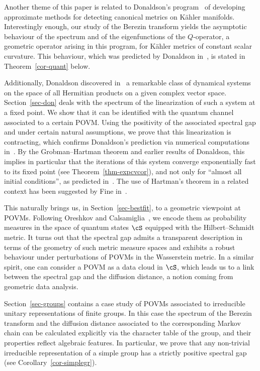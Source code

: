 
Another theme of this paper is related to Donaldson's program~\cite{D} of developing approximate methods for detecting canonical metrics on K\"ahler manifolds. Interestingly enough, our study of the Berezin transform yields the asymptotic behaviour of the spectrum and of the eigenfunctions of the $Q$-operator, a geometric operator arising in this program, for K\"ahler metrics of constant scalar curvature. This behaviour, which was predicted by Donaldson in~\cite{D}, is stated in Theorem~\ref{cor-quant} below.

Additionally, Donaldson discovered in~\cite{D} a remarkable class of dynamical systems on the space of all Hermitian products on a given complex vector space. Section~\ref{sec-don} deals with the spectrum of the linearization of such a system at a fixed point. We show that it can be identified with the quantum channel associated to a certain POVM. Using the positivity of the associated spectral gap and under certain natural assumptions, we prove that this linearization is contracting, which confirms Donaldson's prediction via numerical computations in~\cite[Section~3]{D}. By the Grobman--Hartman theorem and earlier results of Donaldson, this implies in particular that the iterations of this system converge exponentially fast to its fixed point (see Theorem~\ref{thm-expcvcor}), and not only for ``almost all initial conditions'', as predicted in~\cite[Section~4.1]{D}. The use of Hartman's theorem in a related context has been suggested by Fine in~\cite{Fin12}.


This naturally brings us, in Section~\ref{sec-bestfit}, to a geometric viewpoint at POVMs. Following Oreshkov and Calsamiglia~\cite[VII.C]{OC}, we encode them as probability measures in the space of quantum states $\cS$ equipped with the Hilbert--Schmidt metric. It turns out that the spectral gap admits a transparent description in terms of the geometry of such metric measure spaces and exhibits a robust behaviour under perturbations of POVMs in the Wasserstein metric. In a similar spirit, one can consider a POVM as a data cloud in $\cS$, which leads us to a link between the spectral gap and the diffusion distance, a notion coming from geometric data analysis.

Section~\ref{sec-groups} contains a case study of POVMs associated to irreducible unitary representations of finite groups. In this case the spectrum of the Berezin transform and the diffusion distance associated to the corresponding Markov chain can be calculated explicitly via the character table of the group, and their properties reflect algebraic features. In particular, we prove that any non-trivial irreducible representation of a simple group has a strictly positive spectral gap (see Corollary~\ref{cor-simplegr}).


